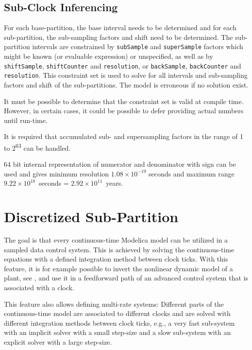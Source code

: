 \subsection{Sub-Clock Inferencing}\label{sub-clock-inferencing}

For each base-partition, the base interval needs to be determined and for each sub-partition, the sub-sampling factors and shift need to be determined.
The sub-partition intervals are constrained by \lstinline!subSample! and \lstinline!superSample! factors which might be known (or evaluable expression) or unspecified, as well as by \lstinline!shiftSample!, \lstinline!shiftCounter! and \lstinline!resolution!, or \lstinline!backSample!, \lstinline!backCounter! and \lstinline!resolution!.
This constraint set is used to solve for all intervals and sub-sampling factors and shift of the sub-partitions.
The model is erroneous if no solution exist.

\begin{nonnormative}
It must be possible to determine that the constraint set is valid at compile time.
However, in certain cases, it could be possible to defer providing actual numbers until run-time.
\end{nonnormative}

It is required that accumulated sub- and supersampling factors in the range of 1 to 2\textsuperscript{63} can be handled.

\begin{nonnormative}
64 bit internal representation of numerator and denominator with sign can be used and gives minimum resolution $1.08\times 10^{-19}$ seconds and maximum range $9.22\times 10^{18}$~seconds = $2.92\times 10^{11}$~years.
\end{nonnormative}

\section{Discretized Sub-Partition}\label{continuous-time-equations-in-clocked-partitions}\label{discretized-partition}

\begin{nonnormative}
The goal is that every continuous-time Modelica model can be utilized in a sampled data control system.
This is achieved by solving the continuous-time equations with a defined integration method between clock ticks.
With this feature, it is for example possible to invert the nonlinear dynamic model of a plant, see \textcite{ThummelEtAl2005InverseModels}, and use it in a feedforward path of an advanced control system that is associated with a clock.

This feature also allows defining multi-rate systems: Different parts of the continuous-time model are associated to different clocks and are solved with different integration
methods between clock ticks, e.g., a very fast sub-system with an implicit solver with a small step-size and a slow sub-system with an explicit solver with a large step-size.
\end{nonnormative}

